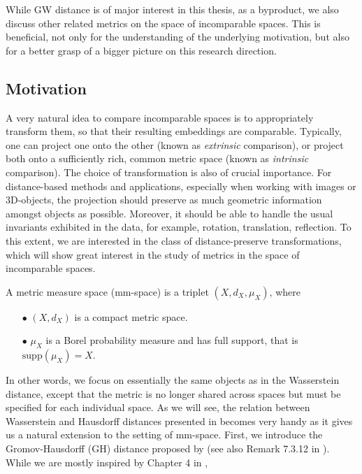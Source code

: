 While GW distance is of major interest in this thesis, as a byproduct,
we also discuss other related metrics on the space of incomparable spaces.
This is beneficial, not only for the understanding of the underlying motivation,
but also for a better grasp of a bigger picture on this research direction.

\subsection{Motivation}

A very natural idea to compare incomparable spaces is to appropriately transform them, so that
their resulting embeddings are comparable. Typically, one can project one onto the other
(known as \textit{extrinsic} comparison), or project both onto a sufficiently rich, common
metric space (known as \textit{intrinsic} comparison).
The choice of transformation is also of crucial importance.
For distance-based methods and applications, especially when working with images or
$3$D-objects, the projection should preserve as much geometric information amongst objects as possible.
Moreover, it should be able to handle the usual invariants exhibited in the data,
for example, rotation, translation, reflection. To this extent, we are interested in the class of
distance-preserve transformations, which will show great interest in the study of metrics
in the space of incomparable spaces.
\begin{definition}
A metric measure space (mm-space) is a triplet $(X, d_X, \mu_X)$, where
\begin{itemize}
  \item[$\bullet$] $(X, d_X)$ is a compact metric space.
  \item[$\bullet$] $\mu_X$ is a Borel probability measure and has full support,
  that is $\text{supp}(\mu_X) = X$.
\end{itemize}
\end{definition}
In other words, we focus on essentially the same objects as in the Wasserstein distance, except that
the metric is no longer shared across spaces but must be specified for each individual space.
As we will see, the relation between Wasserstein and Hausdorff distances presented
in  becomes very handy as it gives us a natural extension to
the setting of mm-space. First, we introduce the Gromov-Hausdorff (GH) distance proposed
by \citep{Gromov81} (see also Remark 7.3.12 in \citep{Burago01}).
While we are mostly inspired by Chapter 4 in \citep{Memoli11},
